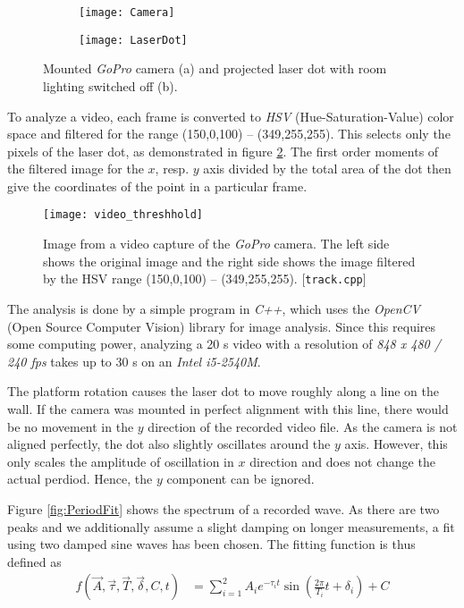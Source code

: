 \documentclass[journal]{IEEEtran}
\begin{document}
\begin{figure}
	\centering

	\begin{subfigure}{0.49\linewidth}
		\texttt{[image: Camera]}
		\subcaption{}
	\end{subfigure}
	\begin{subfigure}{0.49\linewidth}
		\texttt{[image: LaserDot]}
		\subcaption{}
	\end{subfigure}

	\caption{Mounted \emph{GoPro} camera (a) and projected laser dot with room lighting switched off (b).}
	\label{fig:LaserDot}
\end{figure}

To analyze a video, each frame is converted to \emph{HSV} (Hue-Saturation-Value) color space and filtered for the range (150,0,100) -- (349,255,255).
This selects only the pixels of the laser dot, as demonstrated in figure \ref{fig:VideoThreshhold}.
The first order moments of the filtered image for the $x$, resp. $y$ axis divided by the total area of the dot then give the coordinates of the point in a particular frame.

\begin{figure}
	\centering
	\texttt{[image: video\_threshhold]}
	\caption{Image from a video capture of the \emph{GoPro} camera. The left side shows the original image and the right side shows the image filtered by the HSV range (150,0,100) -- (349,255,255). [\texttt{track.cpp}]}
	\label{fig:VideoThreshhold}
\end{figure}

The analysis is done by a simple program in \emph{C++}, which uses the \emph{OpenCV} (Open Source Computer Vision) library for image analysis.
Since this requires some computing power, analyzing a 20 s video with a resolution of \emph{848 x 480 / 240 fps} takes up to 30 s on an \emph{Intel i5-2540M}.

The platform rotation causes the laser dot to move roughly along a line on the wall. If the camera was mounted in perfect alignment with this line, there would be no movement in the $y$ direction of the recorded video file. As the camera is not aligned perfectly, the dot also slightly oscillates around the $y$ axis. However, this only scales the amplitude of oscillation in $x$ direction and does not change the actual perdiod. Hence, the $y$ component can be ignored.

Figure \ref{fig:PeriodFit} shows the spectrum of a recorded wave. As there are two peaks and we additionally assume a slight damping on longer measurements, a fit using two damped sine waves has been chosen.
The fitting function is thus defined as
\begin{align}
	f(\vec{A}, \vec{\tau}, \vec{T}, \vec{\delta}, C, t) & = \sum_{i=1}^2 A_i e^{-\tau_i t} \sin \left( \frac{2\pi}{T_i} t + \delta_i \right) + C
	\label{eq:FitFunction}
\end{align}
\end{document}
